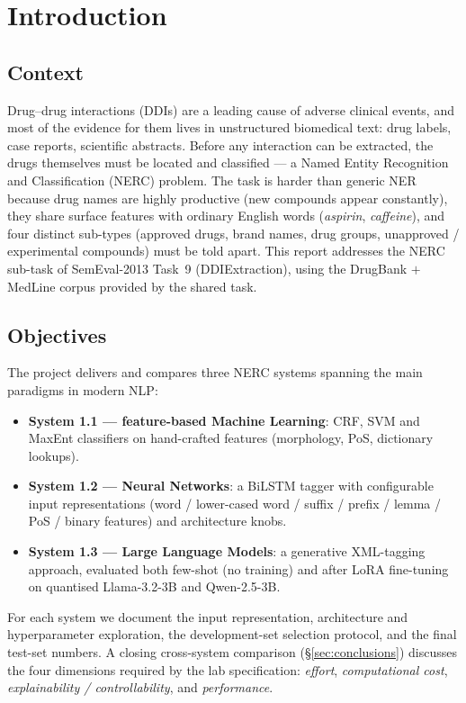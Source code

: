 \documentclass[a4paper,12pt]{article}
\begin{document}

\section{Introduction}

\subsection{Context}
Drug--drug interactions (DDIs) are a leading cause of adverse
clinical events, and most of the evidence for them lives in
unstructured biomedical text: drug labels, case reports, scientific
abstracts. Before any interaction can be extracted, the drugs
themselves must be located and classified --- a Named Entity
Recognition and Classification (NERC) problem. The task is harder
than generic NER because drug names are highly productive (new
compounds appear constantly), they share surface features with
ordinary English words (\textit{aspirin}, \textit{caffeine}), and
four distinct sub-types (approved drugs, brand names, drug groups,
unapproved / experimental compounds) must be told apart. This
report addresses the NERC sub-task of SemEval-2013 Task~9
(DDIExtraction), using the DrugBank $+$ MedLine corpus provided by
the shared task.

\subsection{Objectives}
The project delivers and compares three NERC systems spanning the
main paradigms in modern NLP:
\begin{itemize}[nosep]
    \item \textbf{System 1.1 --- feature-based Machine Learning}:
          CRF, SVM and MaxEnt classifiers on hand-crafted features
          (morphology, PoS, dictionary lookups).
    \item \textbf{System 1.2 --- Neural Networks}: a BiLSTM tagger
          with configurable input representations (word /
          lower-cased word / suffix / prefix / lemma / PoS /
          binary features) and architecture knobs.
    \item \textbf{System 1.3 --- Large Language Models}: a
          generative XML-tagging approach, evaluated both few-shot
          (no training) and after LoRA fine-tuning on quantised
          Llama-3.2-3B and Qwen-2.5-3B.
\end{itemize}
For each system we document the input representation, architecture
and hyperparameter exploration, the development-set selection
protocol, and the final test-set numbers. A closing cross-system
comparison (§\ref{sec:conclusions}) discusses the four dimensions
required by the lab specification: \emph{effort},
\emph{computational cost}, \emph{explainability /
controllability}, and \emph{performance}.
\end{document}
